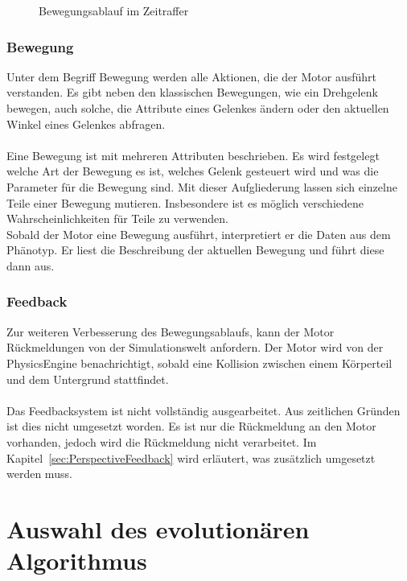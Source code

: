\begin{figure}[H]
        \caption{Bewegungsablauf im Zeitraffer\label{fig:ConceptMovement}}

      \end{figure}

    \subsubsection{Bewegung\label{subsub:EngineMovement}}

      Unter dem Begriff Bewegung werden alle Aktionen, die der Motor ausführt verstanden.
      Es gibt neben den klassischen Bewegungen, wie ein Drehgelenk bewegen,
      auch solche, die Attribute eines Gelenkes ändern oder den aktuellen Winkel eines Gelenkes abfragen.
      \\
      \\
      Eine Bewegung ist mit mehreren Attributen beschrieben.
      Es wird festgelegt welche Art der Bewegung es ist,
      welches Gelenk gesteuert wird und was die Parameter für die Bewegung sind.
      Mit dieser Aufgliederung lassen sich einzelne Teile einer Bewegung mutieren.
      Insbesondere ist es möglich verschiedene Wahrscheinlichkeiten für Teile zu verwenden.
      \\
      Sobald der Motor eine Bewegung ausführt, interpretiert er die Daten aus dem Phänotyp.
      Er liest die Beschreibung der aktuellen Bewegung und führt diese dann aus.

    \subsubsection{Feedback}

      Zur weiteren Verbesserung des Bewegungsablaufs,
      kann der Motor Rückmeldungen von der Simulationswelt anfordern.
      Der Motor wird von der \gls{PhysicsEngine} benachrichtigt,
      sobald eine Kollision zwischen einem Körperteil und dem Untergrund stattfindet.
      \\
      \\
      Das Feedbacksystem ist nicht vollständig ausgearbeitet.
      Aus zeitlichen Gründen ist dies nicht umgesetzt worden.
      Es ist nur die Rückmeldung an den Motor vorhanden, jedoch wird die Rückmeldung nicht verarbeitet.
      Im Kapitel~\vref{sec:PerspectiveFeedback} wird erläutert, was zusätzlich umgesetzt werden muss.

  \section{Auswahl des evolutionären Algorithmus}

